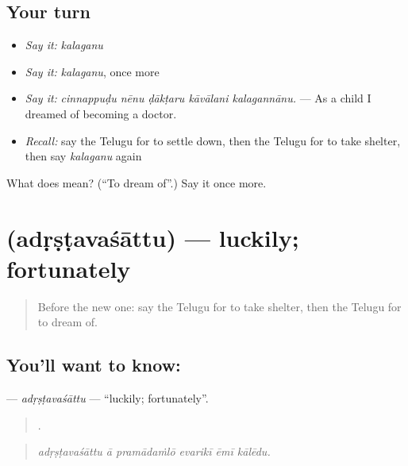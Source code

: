 \subsection*{Your turn}
\begin{itemize}
\raggedright
  \item \emph{Say it:} \emph{kalaganu}
  \item \emph{Say it:} \emph{kalaganu}, once more
  \item \emph{Say it:} \emph{cinnappuḍu nēnu ḍākṭaru kāvālani kalagannānu.} — As a child I dreamed of becoming a doctor.
  \item \emph{Recall:} say the Telugu for to settle down, then the Telugu for to take shelter, then say \emph{kalaganu} again
\end{itemize}

\begin{tcolorbox}[breakable,colback=teal!4,colframe=teal!35!black,title={Before you move on}]
What does  mean? (\textquotedblleft{}To dream of\textquotedblright{}.) Say it once more.
\end{tcolorbox}
\section[\texorpdfstring{\te{అదృష్టవశాత్తు} (adṛṣṭavaśāttu)}{అదృష్టవశాత్తు (adṛṣṭavaśāttu)}]{ (adṛṣṭavaśāttu) — luckily; fortunately}

\label{lesson:TE-C358-adrstavasattu}



\begin{quote}
Before the new one: say the Telugu for to take shelter, then the Telugu for to dream of.
\end{quote}

\subsection*{You'll want to know: }
\textbf{} — \emph{adṛṣṭavaśāttu} — \textquotedblleft{}luckily; fortunately\textquotedblright{}.

\begin{quote}
     .
\end{quote}

\begin{quote}
\emph{adṛṣṭavaśāttu ā pramādaṁlō evarikī ēmī kālēdu.}
\end{quote}

